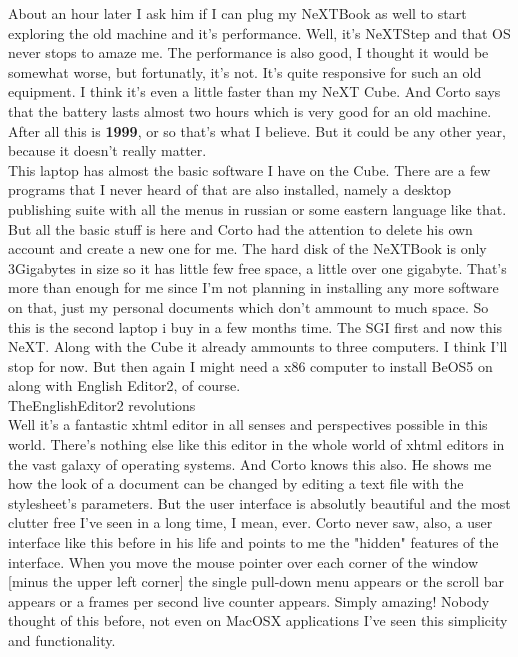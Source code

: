 \documentclass[11pt,twoside,a4paper]{book}
\begin{document}
\begin{multicols*}{2}

About an hour later I ask him if I can plug my NeXTBook as well to start exploring the old machine and it's performance. Well, it's NeXTStep and that OS never stops to amaze me. The performance is also good, I thought it would be somewhat worse, but fortunatly, it's not. It's quite responsive for such an old equipment. I think it's even a little faster than my NeXT Cube. And Corto says that the battery lasts almost two hours which is very good for an old machine. After all this is \textbf{1999}, or so that's what I believe. But it could be any other year, because it doesn't really matter. ~\\

This laptop has almost the basic software I have on the Cube. There are a few programs that I never heard of that are also installed, namely a desktop publishing suite with all the menus in russian or some eastern language like that. But all the basic stuff is here and Corto had the attention to delete his own account and create a new one for me. The hard disk of the NeXTBook is only 3Gigabytes in size so it has little few free space, a little over one gigabyte. That's more than enough for me since I'm not planning in installing any more software on that, just my personal documents which don't ammount to much space. So this is the second laptop i buy in a few months time. The SGI first and now this NeXT. Along with the Cube it already ammounts to three computers. I think I'll stop for now. But then again I might need a x86 computer to install BeOS5 on along with English Editor2, of course. ~\\

{\large TheEnglishEditor2 revolutions} ~\\

Well it's a fantastic xhtml editor in all senses and perspectives possible in this world. There's nothing else like this editor in the whole world of xhtml editors in the vast galaxy of operating systems. And Corto knows this also. He shows me how the look of a document can be changed by editing a text file with the stylesheet's parameters. But the user interface is absolutly beautiful and the most clutter free I've seen in a long time, I mean, ever. Corto never saw, also, a user interface like this before in his life and points to me the "hidden" features of the interface. When you move the mouse pointer over each corner of the window [minus the upper left corner] the single pull-down menu appears or the scroll bar appears or a frames per second live counter appears. Simply amazing! Nobody thought of this before, not even on MacOSX applications I've seen this simplicity and functionality. ~\\


\end{multicols*}
\end{document}
